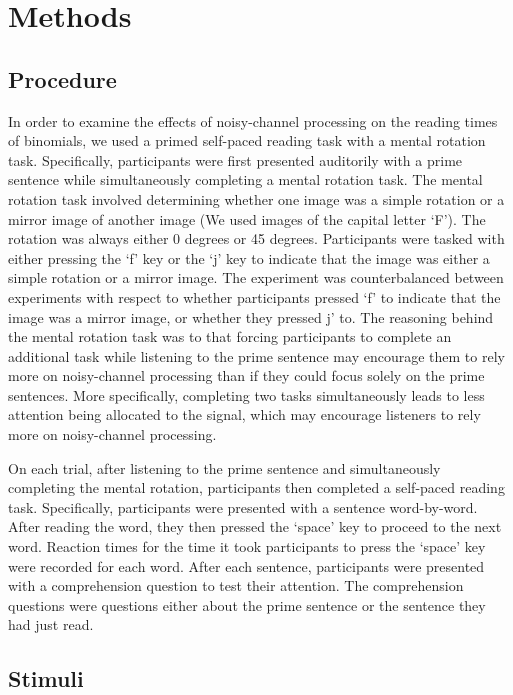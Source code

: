 \documentclass[
  12pt,
]{scrartcl}
\begin{document}
\section{Methods}\label{methods}

\subsection{Procedure}\label{procedure}

In order to examine the effects of noisy-channel processing on the
reading times of binomials, we used a primed self-paced reading task
with a mental rotation task. Specifically, participants were first
presented auditorily with a prime sentence while simultaneously
completing a mental rotation task. The mental rotation task involved
determining whether one image was a simple rotation or a mirror image of
another image (We used images of the capital letter `F'). The rotation
was always either 0 degrees or 45 degrees. Participants were tasked with
either pressing the `f' key or the `j' key to indicate that the image
was either a simple rotation or a mirror image. The experiment was
counterbalanced between experiments with respect to whether participants
pressed `f' to indicate that the image was a mirror image, or whether
they pressed j' to. The reasoning behind the mental rotation task was to
that forcing participants to complete an additional task while listening
to the prime sentence may encourage them to rely more on noisy-channel
processing than if they could focus solely on the prime sentences. More
specifically, completing two tasks simultaneously leads to less
attention being allocated to the signal, which may encourage listeners
to rely more on noisy-channel processing.

On each trial, after listening to the prime sentence and simultaneously
completing the mental rotation, participants then completed a self-paced
reading task. Specifically, participants were presented with a sentence
word-by-word. After reading the word, they then pressed the `space' key
to proceed to the next word. Reaction times for the time it took
participants to press the `space' key were recorded for each word. After
each sentence, participants were presented with a comprehension question
to test their attention. The comprehension questions were questions
either about the prime sentence or the sentence they had just read.

\subsection{Stimuli}\label{stimuli}
\end{document}

